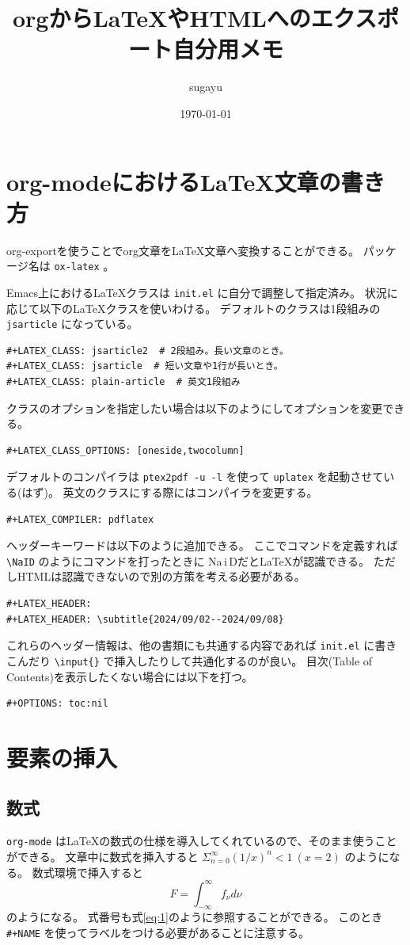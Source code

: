 \documentclass[a4paper, 10pt, notitlepage, uplatex, dvipdfmx]{jsarticle}
\author{sugayu}
\date{\today}
\title{\textbf{orgから\LaTeX{}やHTMLへのエクスポート自分用メモ}}
\newcommand{\NaID}{\mbox{Na\,{\sc i}\,D}}
\begin{document}
\maketitle
\section{org-modeにおける\LaTeX{}文章の書き方}
\label{sec:org04b4cbd}
org-exportを使うことでorg文章を\LaTeX{}文章へ変換することができる。
パッケージ名は \texttt{ox-latex} 。

Emacs上における\LaTeX{}クラスは \texttt{init.el} に自分で調整して指定済み。
状況に応じて以下の\LaTeX{}クラスを使いわける。
デフォルトのクラスは1段組みの \texttt{jsarticle} になっている。

\begin{verbatim}
#+LATEX_CLASS: jsarticle2  # 2段組み。長い文章のとき。
#+LATEX_CLASS: jsarticle  # 短い文章や1行が長いとき。
#+LATEX_CLASS: plain-article  # 英文1段組み
\end{verbatim}
クラスのオプションを指定したい場合は以下のようにしてオプションを変更できる。
\begin{verbatim}
#+LATEX_CLASS_OPTIONS: [oneside,twocolumn]
\end{verbatim}
デフォルトのコンパイラは \texttt{ptex2pdf -u -l} を使って \texttt{uplatex} を起動させている(はず)。
英文のクラスにする際にはコンパイラを変更する。
\begin{verbatim}
#+LATEX_COMPILER: pdflatex
\end{verbatim}
ヘッダーキーワードは以下のように追加できる。
ここでコマンドを定義すれば \texttt{\textbackslash{}NaID} のようにコマンドを打ったときに \NaID だと\LaTeX{}が認識できる。
ただしHTMLは認識できないので別の方策を考える必要がある。
\begin{verbatim}
#+LATEX_HEADER: 
#+LATEX_HEADER: \subtitle{2024/09/02--2024/09/08}
\end{verbatim}
これらのヘッダー情報は、他の書類にも共通する内容であれば \texttt{init.el} に書きこんだり \texttt{\textbackslash{}input\{\}} で挿入したりして共通化するのが良い。
目次(Table of Contents)を表示したくない場合には以下を打つ。
\begin{verbatim}
#+OPTIONS: toc:nil
\end{verbatim}
\section{要素の挿入}
\label{sec:org8eed237}
\subsection{数式}
\label{sec:org91c9d3e}
\texttt{org-mode} は\LaTeX{}の数式の仕様を導入してくれているので、そのまま使うことができる。
文章中に数式を挿入すると \(\Sigma_{n = 0}^{\infty} (1/x)^n < 1\ (x = 2)\) のようになる。
数式環境で挿入すると
\begin{equation}
\label{eq:1}
F = \int_{-\infty}^{\infty} f_{\nu} d\nu
\end{equation}
のようになる。
式番号も式\ref{eq:1}のように参照することができる。
このとき \texttt{\#+NAME} を使ってラベルをつける必要があることに注意する。
\end{document}

